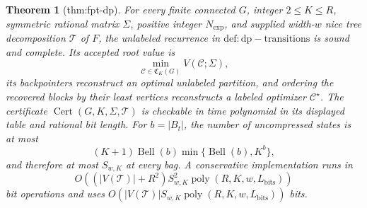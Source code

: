 \documentclass{article}
\newtheorem{theorem}{Theorem}
\begin{document}
\begin{theorem}[thm:fpt-dp]\label{thm:fpt-dp}
For every finite connected \(G\), integer \(2\le K\le R\), symmetric rational matrix \(\Sigma\), positive integer \(N_{\exp}\), and supplied width-\(w\) nice tree decomposition \(\mathcal T\) of \(F\), the unlabeled recurrence in \(\mathrm{def:dp-transitions}\) is sound and complete.  Its accepted root value is
\[
 \min_{\mathcal C\in\mathfrak C_K(G)}V(\mathcal C;\Sigma),
\]
its backpointers reconstruct an optimal unlabeled partition, and ordering the recovered blocks by their least vertices reconstructs a labeled optimizer \(\mathcal C^\star\).  The certificate \(\operatorname{Cert}(G,K,\Sigma,\mathcal T)\) is checkable in time polynomial in its displayed table and rational bit length.  For \(b=|B_t|\), the number of uncompressed states is at most
\[
 (K+1)\operatorname{Bell}(b)\min\{\operatorname{Bell}(b),K^b\},
\]
and therefore at most \(S_{w,K}\) at every bag.  A conservative implementation runs in
\[
 O\!\left((|V(\mathcal T)|+R^2)S_{w,K}^2
 \operatorname{poly}(R,K,w,L_{\mathrm{bits}})\right)
\]
bit operations and uses \(O\!\left(|V(\mathcal T)|S_{w,K}\operatorname{poly}(R,K,w,L_{\mathrm{bits}})\right)\) bits.
\end{theorem}
\end{document}

